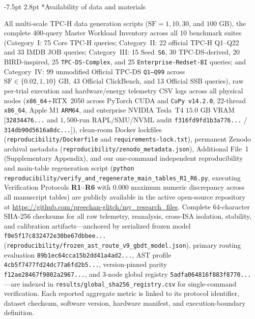 \documentclass[10pt,a4paper]{article}
\makeatletter
\renewcommand\subsection{\@startsection{subsection}{2}{\z@}%
  {-7.5pt \@plus -2pt \@minus -1pt}%
  {2.8pt \@plus 1pt}%
  {\normalfont\normalsize\bfseries}}
\makeatother
\begin{document}
\subsection*{Availability of data and materials}
{\scriptsize All multi-scale TPC-H data generation scripts ($\text{SF}=1, 10, 30$, and $100\text{ GB}$), the complete 400-query Master Workload Inventory across all 10 benchmark suites (Category~I: 75 Core TPC-H queries; Category~II: 22 official TPC-H Q1--Q22 and 33 IMDB JOB queries; Category~III: 15 Seed~\texttt{S6}, 30 TPC-DS-derived, 20 BIRD-inspired, 25 \texttt{TPC-DS-Complex}, and 25 \texttt{Enterprise-Redset-BI} queries; and Category~IV: 99 unmodified Official TPC-DS \texttt{Q1--Q99} across $\text{SF}\in\{0.02, 1, 10\}\text{ GB}$, 43 Official ClickBench, and 13 Official SSB queries), raw per-trial execution and hardware/energy telemetry CSV logs across all physical nodes (\texttt{x86\_64}+RTX~2050 across PyTorch CUDA and \texttt{CuPy v14.2.0}, 22-thread \texttt{x86\_64}, Apple M1 \texttt{ARM64}, and enterprise NVIDIA Tesla~T4 $15.0\text{ GB}$ VRAM [\texttt{32834476...} and $1{,}500$-run RAPL/SMU/NVML audit \texttt{f316fd9fd1b3a776...} / \texttt{314db90d5616a8dc...}]), clean-room Docker lockfiles (\texttt{reproducibility/\allowbreak{}Dockerfile} and \texttt{requirements-\allowbreak{}lock.txt}), permanent Zenodo archival metadata (\texttt{reproducibility/\allowbreak{}zenodo\_\allowbreak{}metadata.json}), Additional File~1 (Supplementary Appendix), and our one-command independent reproducibility and main-table regeneration script (\texttt{python reproducibility/verify\_\allowbreak{}and\_\allowbreak{}regenerate\_\allowbreak{}main\_\allowbreak{}tables\_\allowbreak{}R1\_\allowbreak{}R6.py}, executing Verification Protocols \textbf{R1--R6} with $0.000$ maximum numeric discrepancy across all manuscript tables) are publicly available in the active open-source repository at \url{https://github.com/preechan-glitch/my_research_files}. Complete 64-character SHA-256 checksums for all raw telemetry, reanalysis, cross-ISA isolation, stability, and calibration artifacts---anchored by serialized frozen model \texttt{f0e5f17c832472e30be67dbbee...} (\texttt{reproducibility/\allowbreak{}frozen\_\allowbreak{}ast\_\allowbreak{}route\_\allowbreak{}v9\_\allowbreak{}gbdt\_\allowbreak{}model.json}), primary routing evaluation \texttt{89b1ec64cca15b2dd41a4ad2...}, AST profile \texttt{4cb5f7477fd24dc77a6fd2b5...}, version-pinned parity \texttt{f12ae28467f9802a2967...}, and 3-node global registry \texttt{5adfa064816f883f8770...}---are indexed in \texttt{results/\allowbreak{}global\_\allowbreak{}sha256\_\allowbreak{}registry.csv} for single-command verification. Each reported aggregate metric is linked to its protocol identifier, dataset checksum, software version, hardware manifest, and execution-boundary definition.\par}
\vspace{-5pt}
\end{document}
